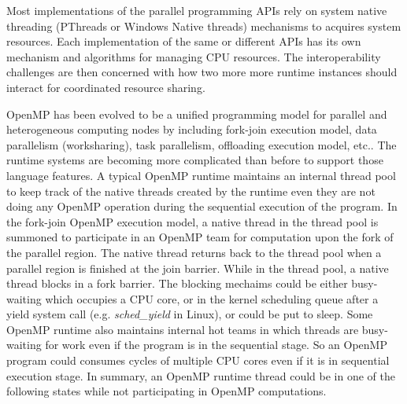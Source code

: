 
Most implementations of the parallel programming APIs rely on system 
native threading (PThreads or Windows Native threads) mechanisms to acquires system resources. 
Each implementation of the same or different APIs has its own mechanism and algorithms for managing
CPU resources. 
The interoperability challenges are then concerned with how 
two more more runtime instances %
should interact for coordinated resource sharing. 

%


OpenMP has been evolved to be a unified programming model for 
parallel and heterogeneous computing nodes by including fork-join execution model, 
data parallelism (worksharing), task parallelism, offloading execution model, etc.. 
The runtime systems are becoming more complicated than before to support those language features.
A typical OpenMP runtime maintains 
an internal thread pool to keep track of the native threads created by the runtime even they are not  
doing any OpenMP operation during the sequential execution of the program. 
In the fork-join OpenMP execution model, a native thread in the thread pool 
is summoned to participate in an OpenMP team for computation upon the fork of the {\sf parallel} region. 
The native thread returns back to the thread pool when a parallel 
region is finished at the join barrier. While in the 
thread pool, a native thread blocks in a fork barrier. The blocking mechaims could be  
either busy-waiting which occupies a CPU core, or in the kernel
scheduling queue after a yield system call (e.g. {\em sched\_yield} in Linux), or could be put to sleep. 
Some OpenMP runtime also maintains
internal hot teams in which threads are busy-waiting for work even if the program is in the sequential stage. 
So an OpenMP program could consumes cycles of multiple CPU cores even if it is in sequential execution stage. In summary, an OpenMP runtime 
thread could be in one of the following states while not participating in OpenMP computations.  

